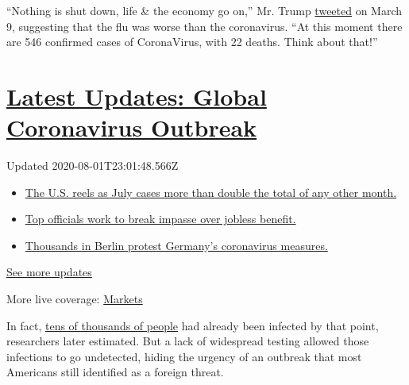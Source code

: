 ``Nothing is shut down, life \& the economy go on,'' Mr. Trump
\href{https://twitter.com/realDonaldTrump/status/1237027356314869761}{tweeted}
on March 9, suggesting that the flu was worse than the coronavirus. ``At
this moment there are 546 confirmed cases of CoronaVirus, with 22
deaths. Think about that!''

\hypertarget{latest-updates-global-coronavirus-outbreak}{%
\section{\texorpdfstring{\href{https://www.nytimes.com/2020/08/01/world/coronavirus-covid-19.html?action=click\&pgtype=Article\&state=default\&region=MAIN_CONTENT_1\&context=storylines_live_updates}{Latest
Updates: Global Coronavirus
Outbreak}}{Latest Updates: Global Coronavirus Outbreak}}\label{latest-updates-global-coronavirus-outbreak}}

Updated 2020-08-01T23:01:48.566Z

\begin{itemize}
\tightlist
\item
  \href{https://www.nytimes.com/2020/08/01/world/coronavirus-covid-19.html?action=click\&pgtype=Article\&state=default\&region=MAIN_CONTENT_1\&context=storylines_live_updates\#link-34047410}{The
  U.S. reels as July cases more than double the total of any other
  month.}
\item
  \href{https://www.nytimes.com/2020/08/01/world/coronavirus-covid-19.html?action=click\&pgtype=Article\&state=default\&region=MAIN_CONTENT_1\&context=storylines_live_updates\#link-3ac56579}{Top
  officials work to break impasse over jobless benefit.}
\item
  \href{https://www.nytimes.com/2020/08/01/world/coronavirus-covid-19.html?action=click\&pgtype=Article\&state=default\&region=MAIN_CONTENT_1\&context=storylines_live_updates\#link-25930521}{Thousands
  in Berlin protest Germany's coronavirus measures.}
\end{itemize}

\href{https://www.nytimes.com/2020/08/01/world/coronavirus-covid-19.html?action=click\&pgtype=Article\&state=default\&region=MAIN_CONTENT_1\&context=storylines_live_updates}{See
more updates}

More live coverage:
\href{https://www.nytimes.com/live/2020/07/31/business/stock-market-today-coronavirus?action=click\&pgtype=Article\&state=default\&region=MAIN_CONTENT_1\&context=storylines_live_updates}{Markets}

In fact,
\href{https://www.nytimes.com/2020/04/23/us/coronavirus-early-outbreaks-cities.html}{tens
of thousands of people} had already been infected by that point,
researchers later estimated. But a lack of widespread testing allowed
those infections to go undetected, hiding the urgency of an outbreak
that most Americans still identified as a foreign threat.

